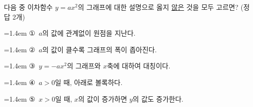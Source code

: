 다음 중 이차함수 $y=ax^2$의 그래프에 대한 설명으로 옳지 \underline{않은} 것을 모두 고르면?  (정답 2개)
\par\medskip\par\noindent\hangindent=1.4em {\small ①}\ $a$의 값에 관계없이 원점을 지난다.\par\noindent\hangindent=1.4em {\small ②}\ $a$의 값이 클수록 그래프의 폭이 좁아진다.\par\noindent\hangindent=1.4em {\small ③}\ $y=-ax^2$의 그래프와 $x$축에 대하여 대칭이다.\par\noindent\hangindent=1.4em {\small ④}\ $a>0$일 때, 아래로 볼록하다.\par\noindent\hangindent=1.4em {\small ⑤}\ $x>0$일 때, $x$의 값이 증가하면 $y$의 값도 증가한다.\par\medskip
